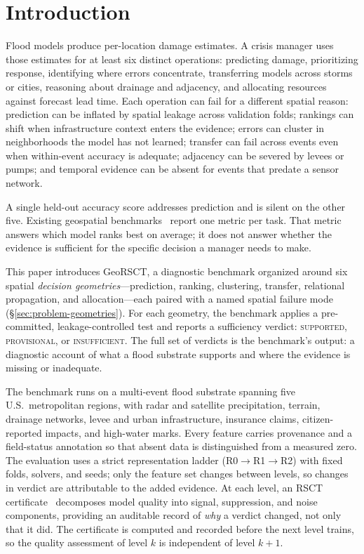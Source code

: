 \section{Introduction}
\label{sec:intro}

Flood models produce per-location damage estimates. A crisis manager
uses those estimates for at least six distinct operations: predicting
damage, prioritizing response, identifying where errors concentrate,
transferring models across storms or cities, reasoning about drainage
and adjacency, and allocating resources against forecast lead time.
Each operation can fail for a different spatial reason: prediction can
be inflated by spatial leakage across validation folds; rankings can
shift when infrastructure context enters the evidence; errors can
cluster in neighborhoods the model has not learned; transfer can fail
across events even when within-event accuracy is adequate; adjacency
can be severed by levees or pumps; and temporal evidence can be absent
for events that predate a sensor network.

A single held-out accuracy score addresses prediction and is silent on
the other five. Existing geospatial benchmarks~\cite{yeh2021sustainbench,
klemmer2023satclip, agarwal2025pdfm, krechetova2025geobenchx} report one
metric per task. That metric answers which model ranks best on average;
it does not answer whether the evidence is sufficient for the specific
decision a manager needs to make.

This paper introduces GeoRSCT, a diagnostic benchmark organized around
six spatial \emph{decision geometries}---prediction, ranking, clustering,
transfer, relational propagation, and allocation---each paired with a
named spatial failure mode (\S\ref{sec:problem-geometries}). For each
geometry, the benchmark applies a pre-committed, leakage-controlled test
and reports a sufficiency verdict: \textsc{supported}, \textsc{provisional},
or \textsc{insufficient}. The full set of verdicts is the benchmark's
output: a diagnostic account of what a flood substrate supports and where
the evidence is missing or inadequate.

The benchmark runs on a multi-event flood substrate spanning five U.S.\
metropolitan regions, with radar and satellite precipitation, terrain,
drainage networks, levee and urban infrastructure, insurance claims,
citizen-reported impacts, and high-water marks. Every feature carries
provenance and a field-status annotation so that absent data is
distinguished from a measured zero. The evaluation uses a strict
representation ladder (R0$\to$R1$\to$R2) with fixed folds, solvers, and
seeds; only the feature set changes between levels, so changes in verdict
are attributable to the added evidence. At each level, an RSCT
certificate~\cite{martin2026rsct} decomposes model quality into signal,
suppression, and noise components, providing an auditable record of
\emph{why} a verdict changed, not only that it did. The certificate is
computed and recorded before the next level trains, so the quality
assessment of level $k$ is independent of level $k{+}1$.

